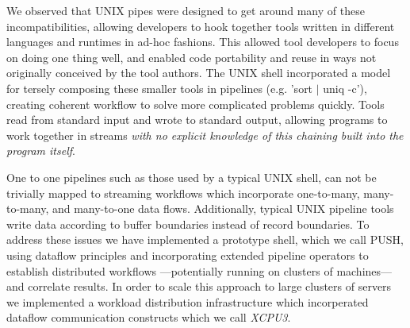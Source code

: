 We observed that UNIX pipes were designed to get around many of these
incompatibilities, allowing developers to hook together tools written
in different languages and runtimes in ad-hoc fashions.  This allowed
tool developers to focus on doing one thing well, and enabled code
portability and reuse in ways not originally conceived by the tool
authors.  The UNIX shell incorporated a model for tersely composing
these smaller tools in pipelines (e.g. 'sort $|$ uniq -c'), creating
coherent workflow to solve more complicated problems quickly.  Tools
read from standard input and wrote to standard output, allowing
programs to work together in streams \emph{with no explicit knowledge
of this chaining built into the program itself}.

One to one pipelines such as those used by a typical UNIX shell,
can not be trivially mapped to streaming workflows which incorporate
one-to-many, many-to-many, and many-to-one data flows.  Additionally,
typical UNIX pipeline tools write data according to buffer boundaries
instead of record boundaries.  
To address these issues we have implemented a prototype shell, which
we call PUSH, using dataflow principles and incorporating extended
pipeline operators to establish distributed workflows ---potentially
running on clusters of machines--- and correlate results. 
In order to scale this approach to large clusters of servers we 
implemented a workload distribution infrastructure which incorperated
dataflow communication constructs which we call \emph{XCPU3}.
%
%

